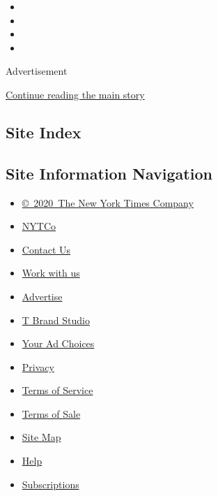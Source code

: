 \begin{itemize}
\item
\item
\item
\item
\end{itemize}

Advertisement

\protect\hyperlink{after-bottom}{Continue reading the main story}

\hypertarget{site-index}{%
\subsection{Site Index}\label{site-index}}

\hypertarget{site-information-navigation}{%
\subsection{Site Information
Navigation}\label{site-information-navigation}}

\begin{itemize}
\tightlist
\item
  \href{https://help.nytimes.com/hc/en-us/articles/115014792127-Copyright-notice}{©~2020~The
  New York Times Company}
\end{itemize}

\begin{itemize}
\tightlist
\item
  \href{https://www.nytco.com/}{NYTCo}
\item
  \href{https://help.nytimes.com/hc/en-us/articles/115015385887-Contact-Us}{Contact
  Us}
\item
  \href{https://www.nytco.com/careers/}{Work with us}
\item
  \href{https://nytmediakit.com/}{Advertise}
\item
  \href{http://www.tbrandstudio.com/}{T Brand Studio}
\item
  \href{https://www.nytimes.com/privacy/cookie-policy\#how-do-i-manage-trackers}{Your
  Ad Choices}
\item
  \href{https://www.nytimes.com/privacy}{Privacy}
\item
  \href{https://help.nytimes.com/hc/en-us/articles/115014893428-Terms-of-service}{Terms
  of Service}
\item
  \href{https://help.nytimes.com/hc/en-us/articles/115014893968-Terms-of-sale}{Terms
  of Sale}
\item
  \href{https://spiderbites.nytimes.com}{Site Map}
\item
  \href{https://help.nytimes.com/hc/en-us}{Help}
\item
  \href{https://www.nytimes.com/subscription?campaignId=37WXW}{Subscriptions}
\end{itemize}
